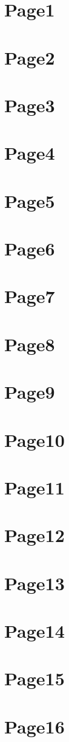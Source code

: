 \documentclass[]{ctexart}
\begin{document}
    \section{Page1} \lipsum[1-1] \newpage
    \section{Page2} \lipsum[2-2] \newpage
    \section{Page3} \lipsum[3-3] \newpage
    \section{Page4} \lipsum[4-4] \newpage
    \section{Page5} \lipsum[1-1] \newpage
    \section{Page6} \lipsum[2-2] \newpage
    \section{Page7} \lipsum[3-3] \newpage
    \section{Page8} \lipsum[4-4] \newpage
    \section{Page9} \lipsum[1-1] \newpage
    \section{Page10} \lipsum[2-2] \newpage
    \section{Page11} \lipsum[3-3] \newpage
    \section{Page12} \lipsum[4-4] \newpage
    \section{Page13} \lipsum[1-1] \newpage
    \section{Page14} \lipsum[2-2] \newpage
    \section{Page15} \lipsum[3-3] \newpage
    \section{Page16} \lipsum[4-4] \newpage
\end{document}
